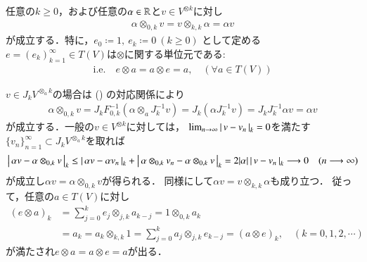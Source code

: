 	\begin{screen}
		\begin{thm}[$T(V)$の単位元の定義]
			任意の$k \geq 0$，および任意の$\alpha \in \mathbb{R}$と$v \in V^{\otimes k}$に対し
			\begin{align}
				\alpha \otimes_{0,k} v = v \otimes_{k,k} \alpha = \alpha v
			\end{align}
			が成立する．特に，$e_0 \coloneqq 1,\ e_k \coloneqq 0\ (k \geq 0)$
			として定める$e=(e_k)_{k=1}^\infty \in T(V)$は$\otimes$に関する単位元である:
			\begin{align}
				\mbox{i.e.}\quad
				e \otimes a = a \otimes e = a,
				\quad (\forall a \in T(V))
			\end{align}
		\end{thm}
	\end{screen}
	
	\begin{prf}
		$v \in J_k V^{\otimes_a k}$の場合は
		()
		の対応関係により
		\begin{align}
			\alpha \otimes_{0,k} v
			= J_k F_{0,k}^{-1}\left( \alpha \otimes_a J_k^{-1}v \right)
			= J_k \left( \alpha J_k^{-1}v \right)
			= J_k J_k^{-1} \alpha v
			= \alpha v
		\end{align}
		が成立する．一般の$v \in V^{\otimes k}$に対しては，
		$\lim_{n \to \infty} \left|\, v-v_n\, \right|_{k} = 0$を満たす
		$\{v_n\}_{n=1}^\infty \subset J_k V^{\otimes_a k}$を取れば
		\begin{align}
			\left|\, \alpha v - \alpha \otimes_{0,k} v\, \right|_{k}
			\leq \left|\, \alpha v - \alpha v_n\, \right|_{k}
				+ \left|\, \alpha \otimes_{0,k} v_n - \alpha \otimes_{0,k} v\, \right|_{k}
			= 2|\alpha| \left|\, v-v_n\, \right|_{k}
			\longrightarrow 0
			\quad (n \longrightarrow \infty)
		\end{align}
		が成立し$\alpha v = \alpha \otimes_{0,k} v$が得られる．
		同様にして$\alpha v = v \otimes_{k,k} \alpha$も成り立つ．
		従って，任意の$a \in T(V)$に対し
		\begin{align}
			(e \otimes a)_k
			&= \sum_{j=0}^k e_j \otimes_{j,k} a_{k-j}
			= 1 \otimes_{0,k} a_k \\
			&= a_k
			= a_k \otimes_{k,k} 1
			= \sum_{j=0}^k a_j \otimes_{j,k} e_{k-j}
			= (a \otimes e)_k,
			\quad (k=0,1,2,\cdots)
		\end{align}
		が満たされ$e \otimes a = a \otimes e = a$が出る．
		\QED
	\end{prf}
	
